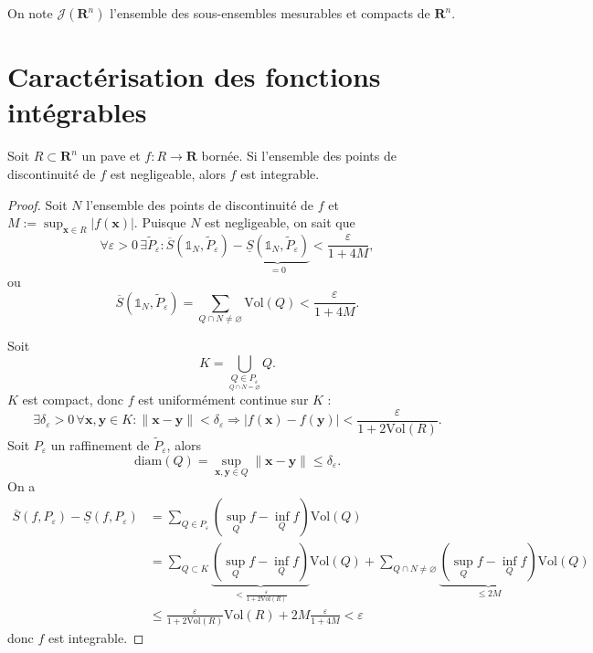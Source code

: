 \begin{notation}
On note $\mathcal{J}(\mathbf{R}^{n})$ l'ensemble des sous-ensembles mesurables et compacts de $\mathbf{R}^{n}$.
\end{notation}
\section{Caractérisation des fonctions intégrables}
\begin{theorem}
Soit $R\subset \mathbf{R}^{n}$ un pave et $f:R\to \mathbf{R}$ bornée. Si l'ensemble des points de discontinuité de $f$ est negligeable, alors $f$ est integrable.
\end{theorem}
\begin{proof}
Soit $N$ l'ensemble des points de discontinuité de $f$ et $M:=\sup_{\boldsymbol{x}\in R}|f(\boldsymbol{x})|$. Puisque $N$ est negligeable, on sait que 
$$
\forall\varepsilon>0\,\exists \tilde{P}_{\varepsilon}:\overline{S}(\mathbb{1}_{N},\tilde{P}_{\varepsilon})-\underbrace{ \underline{S}(\mathbb{1}_{N},\tilde{P}_{\varepsilon}) }_{ =0 }<\frac{\varepsilon}{1+4M},
$$
ou 
$$
\overline{S}(\mathbb{1}_{N},\tilde{P}_{\varepsilon})=\sum _{Q\cap N\neq \varnothing}\mathrm{Vol}(Q)<\frac{\varepsilon}{1+4M}.
$$

Soit 
$$
K=\bigcup _{\underset{Q\cap N=\varnothing}{Q\in P_{\varepsilon}}}Q.
$$
$K$ est compact, donc $f$ est uniformément continue sur $K$ :
$$
\exists\delta _{\varepsilon}>0\,\forall \boldsymbol{x},\boldsymbol{y}\in K:\lVert \boldsymbol{x}-\boldsymbol{y} \rVert <\delta _{\varepsilon}\Rightarrow |f(\boldsymbol{x})-f(\boldsymbol{y})|< \frac{\varepsilon}{1+2\mathrm{Vol}(R)}.
$$
Soit $P_{\varepsilon}$ un raffinement de $\tilde{P}_{\varepsilon}$, alors
$$
\mathrm{diam}(Q)=\sup_{\boldsymbol{x},\boldsymbol{y}\in Q}\lVert \boldsymbol{x}-\boldsymbol{y} \rVert \le \delta _{\varepsilon}.
$$
On a 
\begin{align*}
\overline{S}(f,P_{\varepsilon})-\underline{S}(f,P_{\varepsilon}) & =\sum _{Q\in P_{\varepsilon}}(\sup_{Q}f-\inf_{Q}f )\mathrm{Vol}(Q) \\
 & =\sum _{Q\subset K}\underbrace{ (\sup_{Q}f-\inf_{Q}f) }_{ < \frac{\varepsilon}{1+2\mathrm{Vol}(R)} }\mathrm{Vol}(Q)+\sum _{Q\cap N\neq \varnothing}\underbrace{ (\sup_{Q}f-\inf_{Q}f) }_{ \le 2M }\mathrm{Vol}(Q) \\
 & \le \frac{\varepsilon}{1+2\mathrm{Vol}(R)}\mathrm{Vol}(R)+2M \frac{\varepsilon}{1+4M}<\varepsilon
\end{align*}
donc $f$ est integrable.
\end{proof}

